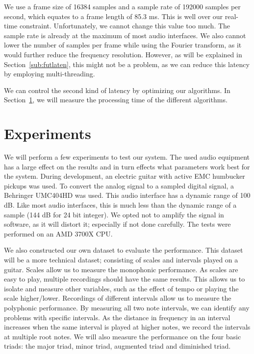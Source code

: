 \documentclass[10pt,twocolumn]{article}
\begin{document}
We use a frame size of 16384 samples and a sample rate of 192000 samples per second, which equates to a frame length of 85.3 ms. This is well over our real-time constraint. Unfortunately, we cannot change this value too much. The sample rate is already at the maximum of most audio interfaces. We also cannot lower the number of samples per frame while using the Fourier transform, as it would further reduce the frequency resolution. However, as will be explained in Section~\ref{sub:futlaten}, this might not be a problem, as we can reduce this latency by employing multi-threading.

We can control the second kind of latency by optimizing our algorithms. In Section~\ref{sec:exp}, we will measure the processing time of the different algorithms.


\section{Experiments}  \label{sec:exp}
We will perform a few experiments to test our system. The used audio equipment has a large effect on the results and in turn effects what parameters work best for the system. During development, an electric guitar with active EMC humbucker pickups was used. To convert the analog signal to a sampled digital signal, a Behringer UMC404HD was used. This audio interface has a dynamic range of 100 dB. Like most audio interfaces, this is much less than the dynamic range of a sample (144 dB for 24 bit integer). We opted not to amplify the signal in software, as it will distort it; especially if not done carefully. The tests were performed on an AMD 3700X CPU.
%

We also constructed our own dataset to evaluate the performance. This dataset will be a more technical dataset; consisting of scales and intervals played on a guitar. Scales allow us to measure the monophonic performance. As scales are easy to play, multiple recordings should have the same results. This allows us to isolate and measure other variables, such as the effect of tempo or playing the scale higher/lower. Recordings of different intervals allow us to measure the polyphonic performance. By measuring all two note intervals, we can identify any problems with specific intervals. As the distance in frequency in an interval increases when the same interval is played at higher notes, we record the intervals at multiple root notes. We will also measure the performance on the four basic triads: the major triad, minor triad, augmented triad and diminished triad.
\end{document}
